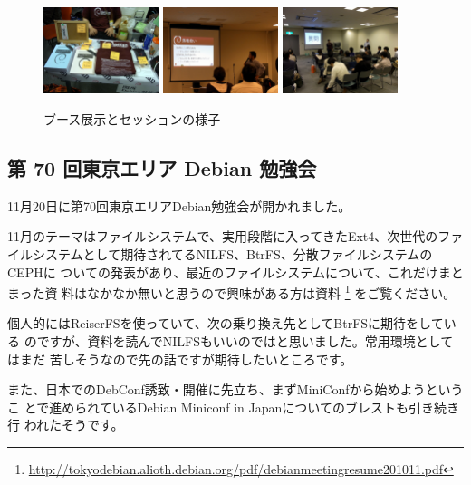 \documentclass[mingoth,a4paper]{jsarticle}
\begin{document}
\begin{figure}[h]
    \centering
    \includegraphics[width=0.30\textwidth]{image201012/kof1.jpg}
    \includegraphics[width=0.30\textwidth]{image201012/kof2.jpg}
    \includegraphics[width=0.30\textwidth]{image201012/kof4.jpg}
    \caption{ブース展示とセッションの様子}
\end{figure}


\subsection{第 70 回東京エリア Debian 勉強会}

11月20日に第70回東京エリアDebian勉強会が開かれました。

11月のテーマはファイルシステムで、実用段階に入ってきたExt4、次世代のファ
イルシステムとして期待されてるNILFS、BtrFS、分散ファイルシステムのCEPHに
ついての発表があり、最近のファイルシステムについて、これだけまとまった資
料はなかなか無いと思うので興味がある方は資料
\footnote{\url{http://tokyodebian.alioth.debian.org/pdf/debianmeetingresume201011.pdf}}
をご覧ください。

個人的にはReiserFSを使っていて、次の乗り換え先としてBtrFSに期待をしている
のですが、資料を読んでNILFSもいいのではと思いました。常用環境としてはまだ
苦しそうなので先の話ですが期待したいところです。

また、日本でのDebConf誘致・開催に先立ち、まずMiniConfから始めようというこ
とで進められているDebian Miniconf in Japanについてのブレストも引き続き行
われたそうです。
\end{document}
